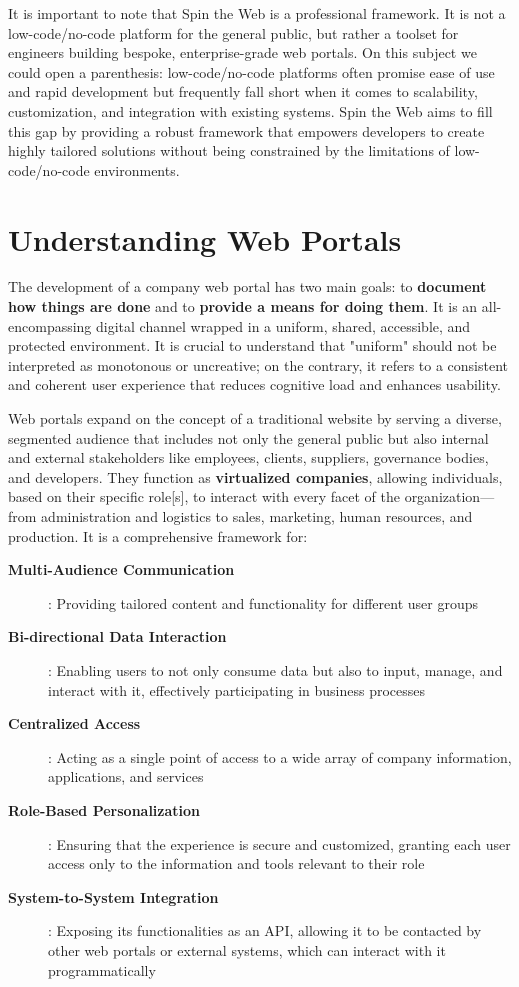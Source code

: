 It is important to note that Spin the Web is a professional framework. It is not a low-code/no-code platform for the general public, but rather a toolset for engineers building bespoke, enterprise-grade web portals. On this subject we could open a parenthesis: low-code/no-code platforms often promise ease of use and rapid development but frequently fall short when it comes to scalability, customization, and integration with existing systems. Spin the Web aims to fill this gap by providing a robust framework that empowers developers to create highly tailored solutions without being constrained by the limitations of low-code/no-code environments.

\section{Understanding Web Portals}
\label{sec:web-portals}

The development of a company web portal has two main goals: to \textbf{document how things are done} and to \textbf{provide a means for doing them}. It is an all-encompassing digital channel wrapped in a uniform, shared, accessible, and protected environment. It is crucial to understand that "uniform" should not be interpreted as monotonous or uncreative; on the contrary, it refers to a consistent and coherent user experience that reduces cognitive load and enhances usability.

Web portals expand on the concept of a traditional website by serving a diverse, segmented audience that includes not only the general public but also internal and external stakeholders like employees, clients, suppliers, governance bodies, and developers. They function as \textbf{virtualized companies}, allowing individuals, based on their specific role[s], to interact with every facet of the organization—from administration and logistics to sales, marketing, human resources, and production. It is a comprehensive framework for:

\begin{description}
\item[\textbf{Multi-Audience Communication}]: Providing tailored content and functionality for different user groups
\item[\textbf{Bi-directional Data Interaction}]: Enabling users to not only consume data but also to input, manage, and interact with it, effectively participating in business processes
\item[\textbf{Centralized Access}]: Acting as a single point of access to a wide array of company information, applications, and services
\item[\textbf{Role-Based Personalization}]: Ensuring that the experience is secure and customized, granting each user access only to the information and tools relevant to their role
\item[\textbf{System-to-System Integration}]: Exposing its functionalities as an API, allowing it to be contacted by other web portals or external systems, which can interact with it programmatically
\end{description}


